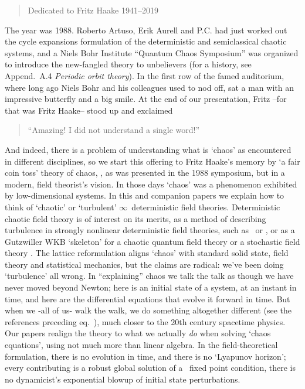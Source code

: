 
\begin{quote}
     Dedicated to Fritz Haake 1941--2019
\end{quote}



The year was 1988.
Roberto Artuso, Erik Aurell and P.C. had just worked out the cycle
expansions formulation of the deterministic and semiclassical chaotic
systems, and a Niels Bohr Institute ``Quantum Chaos
Symposium'' was organized to introduce the new-fangled theory to
unbelievers (for a history, see  {Append.~A.4
{\em Periodic orbit theory}}).
In the first row of the famed auditorium, where long ago Niels Bohr and
his colleagues used to nod off, sat a man with an impressive butterfly
and a big smile. At the end of our presentation, Fritz --for that was
Fritz Haake-- stood up and exclaimed

\begin{quote}
     ``Amazing! I did not understand a single word!''
\end{quote}

And indeed, there is a problem of understanding what is `chaos' as
encountered in different disciplines, so we start this offering to Fritz
Haake's memory by {`a fair coin toss'} theory of chaos,
, as was presented in the 1988 symposium, but in a
modern, field theorist's vision. In those days `chaos' was a phenomenon
exhibited by low-dimensional systems. In this and companion papers%
 we explain how to think of `chaotic' or
`turbulent' $\infty$\dmn\ deterministic field theories. Deterministic
chaotic field theory is of interest on its merits, as a method of
describing turbulence in strongly nonlinear deterministic field theories,
such as \NS\ or \KS{}, or as a Gutzwiller WKB
`skeleton' for a chaotic quantum field theory
or a stochastic field theory%
.
The lattice reformulation aligns `chaos' with standard solid state, field
theory and statistical mechanics, but the claims are radical: we've been
doing `turbulence' all wrong.
In ``explaining'' chaos we talk the talk as though we have never moved
beyond Newton; here is an initial state of a system, at an instant in
time, and here are the differential equations that evolve it forward in
time. But when we -all of us- walk the walk, we do something altogether
different (see the references preceding eq.~), much
closer to the 20th century spacetime physics.
Our papers realign the theory to what we
actually {\em do} when solving `chaos equations', using not much more
than linear algebra.
In the field-theoretical formulation, there is no evolution in time, and
there is no `Lyapunov horizon'; every contributing {\em \lattstate} is a
robust global solution of a \spt\ fixed point condition, there is no
dynamicist's exponential blowup of initial state perturbations.

